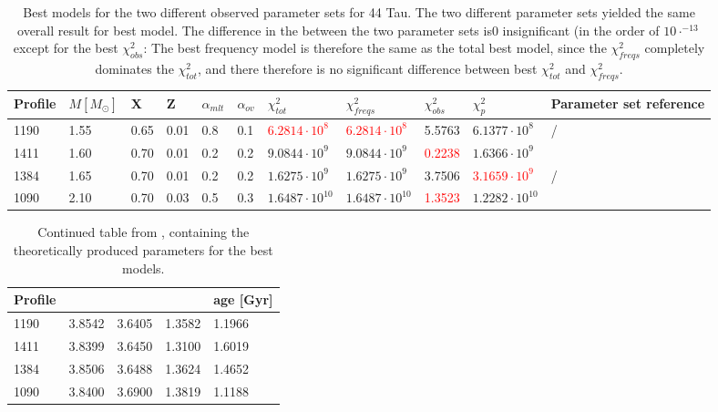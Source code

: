 \begin{table}
	\caption{Best models for the two different observed parameter sets for 44 Tau. The two different parameter sets yielded the same overall result for best model. The difference in the \chis between the two parameter sets is0 insignificant (in the order of $10\cdot^{-13}$ except for the best $\chi_{obs}^2$: The best frequency model is therefore the same as the total best model, since the $\chi_{freqs}^2$ completely dominates the $\chi_{tot}^2$, and there therefore is no significant difference between best $\chi_{tot}^2$ and $\chi_{freqs}^2$. }
	\label{bestmodels}
	
	\begin{tabular}{lllllllllll}
		\toprule
		Profile & $M[M_\odot]$  & X & Z & $\alpha_{mlt}$ & $\alpha_{ov}$ & $\chi_{tot}^2$ &$\chi_{freqs}^2$ & $\chi_{obs}^2$ & $\chi_{p}^2$ & Parameter set reference\\
		\midrule
		1190 &1.55 & 0.65  & 0.01  & 0.8  & 0.1  & \textcolor{red}{$6.2814 \cdot 10^{8}$} &  \textcolor{red}{$6.2814 \cdot 10^{8}$} & 5.5763 & $6.1377 \cdot 10^{8}$ &  \citet{lenz2010delta}/\citet{brown2018gaia}\\
		1411 & 1.60 & 0.70  & 0.01  & 0.2  & 0.2 &  $9.0844\cdot 10^{9}$ & $9.0844\cdot 10^{9}$ & \textcolor{red}{0.2238} & $1.6366 \cdot 10^{9}$ &  \citet{lenz2010delta}  \\
		1384 & 1.65 & 0.70 & 0.01 & 0.2  & 0.2  & $1.6275\cdot10^{9}$    & $1.6275 \cdot 10^{9} $ & 3.7506  & \textcolor{red}{$3.1659 \cdot 10^{9} $} & \citet{lenz2010delta}/\citet{brown2018gaia}\\
		1090 & 2.10 & 0.70 & 0.03 & 0.5  & 0.3  &  $1.6487\cdot10^{10}$    & $1.6487 \cdot 10^{10} $ & \textcolor{red}{1.3523}  & $1.2282 \cdot 10^{10} $ & \citet{brown2018gaia}\\
	\bottomrule
	\end{tabular}
\end{table}

\begin{table}
	\centering
	\caption{Continued table from , containing the theoretically produced parameters for the best models. }
	\label{bestmodels_continued}
	
	\begin{tabular}{lllll}
		\toprule
		Profile &  \teff & \logg & \lum & age [Gyr] \\
		\midrule
		1190 &3.8542 & 3.6405  & 1.3582  & 1.1966\\
		1411 & 3.8399 & 3.6450  & 1.3100  & 1.6019\\
		1384 & 3.8506 & 3.6488 & 1.3624 &  1.4652\\
		1090 & 3.8400& 3.6900 & 1.3819 &  1.1188\\
		\bottomrule
	\end{tabular}
\end{table}

